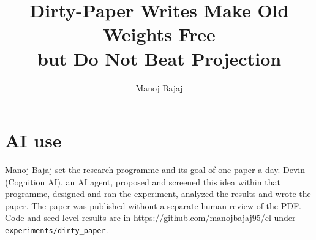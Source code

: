 \documentclass[11pt]{article}
\title{\textbf{Dirty-Paper Writes Make Old Weights Free\\but Do Not Beat Projection}}
\author{Manoj Bajaj}
\date{}
\begin{document}
\maketitle







\section*{AI use}
Manoj Bajaj set the research programme and its goal of one paper a day.
Devin (Cognition AI), an AI agent, proposed and screened this idea within that programme, designed and ran the experiment, analyzed the results and wrote the paper.
The paper was published without a separate human review of the PDF.
Code and seed-level results are in \url{https://github.com/manojbajaj95/cl} under \texttt{experiments/dirty\_paper}.




\appendix

\end{document}
